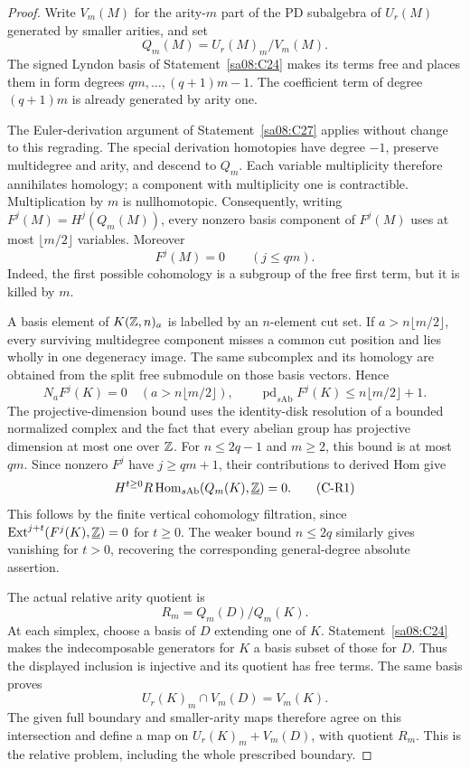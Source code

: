 \begin{proof}
Write $V_m(M)$ for the arity-$m$ part of the PD subalgebra
of $U_r(M)$ generated by smaller arities, and set
\[
 Q_m(M)=U_r(M)_m/V_m(M).
\]
The signed Lyndon basis of Statement~\ref{sa08:C24} makes its
terms free and places them in form degrees
$qm,\ldots,(q+1)m-1$. The coefficient term of degree $(q+1)m$
is already generated by arity one.

The Euler-derivation argument of Statement~\ref{sa08:C27}
applies without change to this regrading. The special derivation
homotopies have degree $-1$, preserve multidegree and arity, and
descend to $Q_m$. Each variable multiplicity therefore annihilates
homology; a component with multiplicity one is contractible.
Multiplication by $m$ is nullhomotopic. Consequently, writing
$F^j(M)=H^j(Q_m(M))$, every nonzero basis component of $F^j(M)$
uses at most $\lfloor m/2\rfloor$ variables. Moreover
\[
 F^j(M)=0\qquad(j\leq qm).
\]
Indeed, the first possible cohomology is a subgroup of the free
first term, but it is killed by $m$.

A basis element of $K(\mathbb Z,n)_a$ is labelled by an $n$-element
cut set. If $a>n\lfloor m/2\rfloor$, every surviving multidegree
component misses a common cut position and lies wholly in one
degeneracy image. The same subcomplex and its homology are obtained
from the split free submodule on those basis vectors. Hence
\[
 N_aF^j(K)=0\quad(a>n\lfloor m/2\rfloor),\qquad
 \operatorname{pd}_{s\mathrm{Ab}}F^j(K)
       \leq n\lfloor m/2\rfloor+1.
\]
The projective-dimension bound uses the identity-disk resolution
of a bounded normalized complex and the fact that every abelian
group has projective dimension at most one over $\mathbb Z$.
For $n\leq2q-1$ and $m\geq2$, this bound is at most $qm$.
Since nonzero $F^j$ have $j\geq qm+1$, their contributions to
derived Hom give
\begin{equation}
 H^{t\geq0}R\operatorname{Hom}_{s\mathrm{Ab}}
       (Q_m(K),\underline{\mathbb Z})=0.
 \tag{C-R1}
\end{equation}
This follows by the finite vertical cohomology filtration, since
$\operatorname{Ext}^{j+t}(F^j(K),\underline{\mathbb Z})=0$ for $t\geq0$.
The weaker bound $n\leq2q$ similarly gives vanishing for $t>0$,
recovering the corresponding general-degree absolute assertion.

The actual relative arity quotient is
\[
 R_m=Q_m(D)/Q_m(K).
\]
At each simplex, choose a basis of $D$ extending one of $K$.
Statement~\ref{sa08:C24} makes the indecomposable generators
for $K$ a basis subset of those for $D$. Thus the displayed
inclusion is injective and its quotient has free terms. The same
basis proves
\[
 U_r(K)_m\cap V_m(D)=V_m(K).
\]
The given full boundary and smaller-arity maps therefore agree
on this intersection and define a map on
$U_r(K)_m+V_m(D)$, with quotient $R_m$. This is the relative
problem, including the whole prescribed boundary.


\end{proof}

